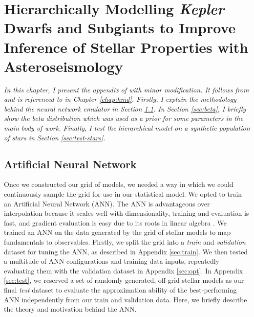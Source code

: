 %
%
%
%
%
\chapter[Hierarchically Modelling Dwarf and Subgiant Stars]{Hierarchically Modelling \emph{Kepler} Dwarfs and Subgiants to Improve Inference of Stellar Properties with Asteroseismology}\label{apx:hmd}

\textit{%
    In this chapter, I present the appendix of \citet{Lyttle.Davies.ea2021} with minor modification. It follows from and is referenced to in Chapter \ref{chap:hmd}. Firstly, I explain the methodology behind the neural network emulator in Section \ref{sec:ann}. In Section \ref{sec:beta}, I briefly show the beta distribution which was used as a prior for some parameters in the main body of work. Finally, I test the hierarchical model on a synthetic population of stars in Section \ref{sec:test-stars}.
}

\section{Artificial Neural Network}\label{sec:ann}



Once we constructed our grid of models, we needed a way in which we could continuously sample the grid for use in our statistical model. We opted to train an Artificial Neural Network (ANN). The ANN is advantageous over interpolation because it scales well with dimensionality, training and evaluation is fast, and gradient evaluation is easy due to its roots in linear algebra \citep{Haykin2007}. We trained an ANN on the data generated by the grid of stellar models to map fundamentals to observables. Firstly, we split the grid into a \emph{train} and \emph{validation} dataset for tuning the ANN, as described in Appendix \ref{sec:train}. We then tested a multitude of ANN configurations and training data inputs, repeatedly evaluating them with the validation dataset in Appendix \ref{sec:opt}. In Appendix \ref{sec:test}, we reserved a set of randomly generated, off-grid stellar models as our final \emph{test} dataset to evaluate the approximation ability of the best-performing ANN independently from our train and validation data. Here, we briefly describe the theory and motivation behind the ANN.

